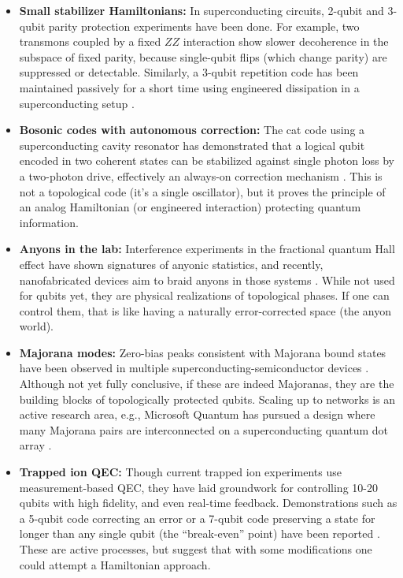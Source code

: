 \documentclass[11pt]{article}
\begin{document}
\begin{itemize}
    \item \textbf{Small stabilizer Hamiltonians:} In superconducting circuits, 2-qubit and 3-qubit parity protection experiments have been done. For example, two transmons coupled by a fixed $ZZ$ interaction show slower decoherence in the subspace of fixed parity, because single-qubit flips (which change parity) are suppressed or detectable. Similarly, a 3-qubit repetition code has been maintained passively for a short time using engineered dissipation in a superconducting setup \cite{Leghtas2013}.
    \item \textbf{Bosonic codes with autonomous correction:} The cat code using a superconducting cavity resonator has demonstrated that a logical qubit encoded in two coherent states can be stabilized against single photon loss by a two-photon drive, effectively an always-on correction mechanism \cite{Ofek2016}. This is not a topological code (it's a single oscillator), but it proves the principle of an analog Hamiltonian (or engineered interaction) protecting quantum information.
    \item \textbf{Anyons in the lab:} Interference experiments in the fractional quantum Hall effect have shown signatures of anyonic statistics, and recently, nanofabricated devices aim to braid anyons in those systems \cite{Nayak2008}. While not used for qubits yet, they are physical realizations of topological phases. If one can control them, that is like having a naturally error-corrected space (the anyon world).
    \item \textbf{Majorana modes:} Zero-bias peaks consistent with Majorana bound states have been observed in multiple superconducting-semiconductor devices \cite{Mourik2012}. Although not yet fully conclusive, if these are indeed Majoranas, they are the building blocks of topologically protected qubits. Scaling up to networks is an active research area, e.g., Microsoft Quantum has pursued a design where many Majorana pairs are interconnected on a superconducting quantum dot array \cite{Karzig2017}.
    \item \textbf{Trapped ion QEC:} Though current trapped ion experiments use measurement-based QEC, they have laid groundwork for controlling 10-20 qubits with high fidelity, and even real-time feedback. Demonstrations such as a 5-qubit code correcting an error or a 7-qubit code preserving a state for longer than any single qubit (the ``break-even'' point) have been reported \cite{RyanAnderson2021}. These are active processes, but suggest that with some modifications one could attempt a Hamiltonian approach.

\end{itemize}
\end{document}
